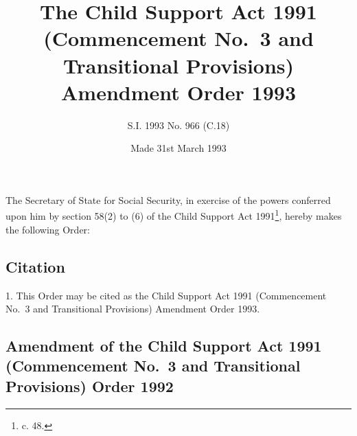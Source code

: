 \documentclass[a4paper]{article}
\title{The Child Support Act 1991 (Commencement No.\ 3 and Transitional Provisions) Amendment Order 1993}
\author{S.I. 1993 No. 966 (C.18)}
\date{Made 31st March 1993}
\begin{document}
\maketitle

\noindent
The Secretary of State for Social Security, in exercise of the powers conferred upon him by section 58(2) to (6) of the Child Support Act 1991\footnote{ c. 48.}, hereby makes the following Order:

{\sloppy

\tableofcontents

}

\setcounter{secnumdepth}{-2}

\subsection[1. Citation]{Citation}

1.   This Order may be cited as the Child Support Act 1991 (Commencement No.\ 3 and Transitional Provisions) Amendment Order 1993.

\subsection[2. Amendment of the Child Support Act 1991 (Commencement No.\ 3 and Transitional Provisions) Order 1992]{Amendment of the Child Support Act 1991 (Commencement No.\ 3 and Transitional Provisions) Order 1992}
\end{document}
